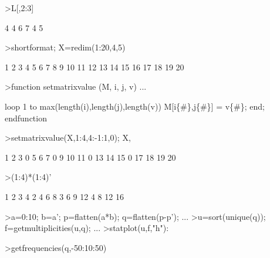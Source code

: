 \documentclass[a4paper,10pt]{article}
\begin{document}
\begin{eulernotebook}
\begin{eulercomment}
\begin{eulercomment}
\begin{eulercomment}
\begin{eulercomment}
\begin{eulercomment}
\begin{eulercomment}
\begin{eulercomment}
\begin{eulercomment}
\begin{eulercomment}
\begin{eulercomment}
\begin{eulercomment}
\end{eulercomment}
\begin{eulerprompt}
>L[,2:3]
\end{eulerprompt}
\begin{euleroutput}
          4         4 
          6         7 
          4         5 
\end{euleroutput}
\begin{eulerprompt}
>shortformat; X=redim(1:20,4,5)
\end{eulerprompt}
\begin{euleroutput}
          1         2         3         4         5 
          6         7         8         9        10 
         11        12        13        14        15 
         16        17        18        19        20 
\end{euleroutput}
\begin{eulerprompt}
>function setmatrixvalue (M, i, j, v) ...
\end{eulerprompt}
\begin{eulerudf}
  loop 1 to max(length(i),length(j),length(v))
     M[i\{#\},j\{#\}] = v\{#\};
  end;
  endfunction
\end{eulerudf}
\begin{eulerprompt}
>setmatrixvalue(X,1:4,4:-1:1,0); X,
\end{eulerprompt}
\begin{euleroutput}
          1         2         3         0         5 
          6         7         0         9        10 
         11         0        13        14        15 
          0        17        18        19        20 
\end{euleroutput}
\begin{eulerprompt}
>(1:4)*(1:4)'
\end{eulerprompt}
\begin{euleroutput}
          1         2         3         4 
          2         4         6         8 
          3         6         9        12 
          4         8        12        16 
\end{euleroutput}
\begin{eulerprompt}
>a=0:10; b=a'; p=flatten(a*b); q=flatten(p-p'); ...
>u=sort(unique(q)); f=getmultiplicities(u,q); ...
>statplot(u,f,"h"):
\end{eulerprompt}
\begin{eulerprompt}
>getfrequencies(q,-50:10:50)
\end{eulerprompt}
\begin{euleroutput}

\end{euleroutput}
\end{eulercomment}
\end{eulercomment}
\end{eulercomment}
\end{eulercomment}
\end{eulercomment}
\end{eulercomment}
\end{eulercomment}
\end{eulercomment}
\end{eulercomment}
\end{eulercomment}
\end{eulernotebook}
\end{document}
